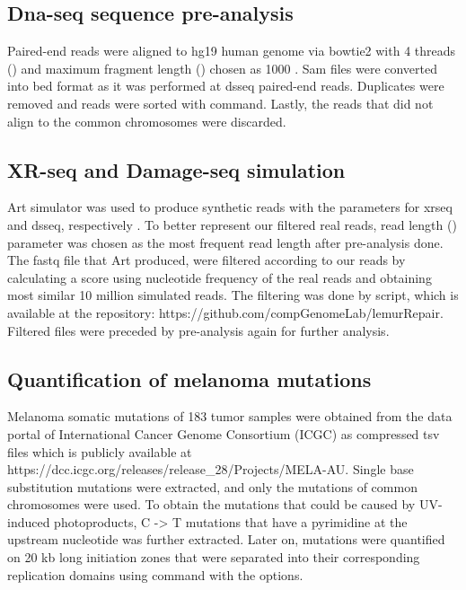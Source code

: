 \subsection{Dna-seq sequence pre-analysis}
Paired-end reads were aligned to hg19 human genome via bowtie2 with 4 threads () and maximum fragment length () chosen as 1000 \citep{langmead2012fast}. Sam files were converted into bed format as it was performed at \gls{dsseq} paired-end reads. Duplicates were removed and reads were sorted with  command. Lastly, the reads that did not align to the common chromosomes were discarded.

\subsection{XR-seq and Damage-seq simulation}
Art simulator was used to produce synthetic reads with the parameters
 for \gls{xrseq} and \gls{dsseq}, respectively \citep{huang2012art}. To better represent our filtered real reads, read length () parameter was chosen as the most frequent read length after pre-analysis done. The fastq file that Art produced, were filtered according to our reads by calculating a score using nucleotide frequency of the real reads and obtaining most similar 10 million simulated reads. 
The filtering was done by  script, which is available at the repository: https://github.com/compGenomeLab/lemurRepair. 
Filtered files were preceded by pre-analysis again for further analysis.

\subsection{Quantification of melanoma mutations}
Melanoma somatic mutations of 183 tumor samples were obtained from the data portal of International Cancer Genome Consortium (ICGC) as compressed tsv files which is publicly available at https://dcc.icgc.org/releases/release\_28/Projects/MELA-AU. Single base substitution mutations were extracted, and only the mutations of common chromosomes were used. To obtain the mutations that could be caused by UV-induced photoproducts, C -> T mutations that have a pyrimidine at the upstream nucleotide was further extracted. Later on, mutations were quantified on 20 \gls{kb} long initiation zones that were separated into their corresponding replication domains using  command with the  options.

